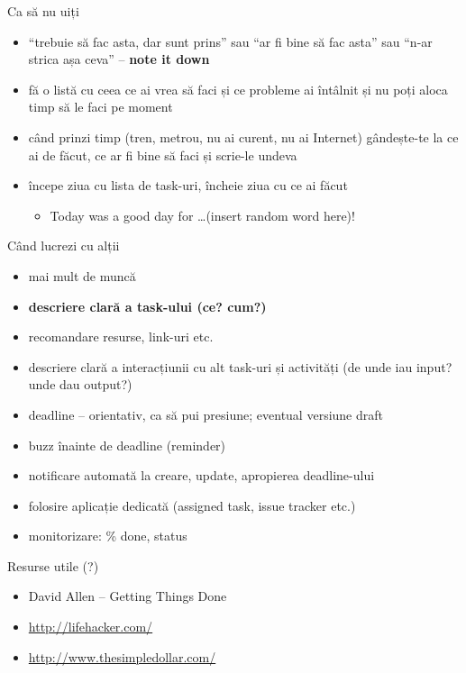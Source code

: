\documentclass{beamer}
\begin{document}
\begin{frame}{Ca să nu uiți}
  \begin{itemize}
    \item ``trebuie să fac asta, dar sunt prins'' sau ``ar fi bine să fac
    asta'' sau ``n-ar strica așa ceva'' -- \textbf{note it down}
    \item fă o listă cu ceea ce ai vrea să faci și ce probleme ai întâlnit și
    nu poți aloca timp să le faci pe moment
    \item când prinzi timp (tren, metrou, nu ai curent, nu ai Internet)
    gândește-te la ce ai de făcut, ce ar fi bine să faci și scrie-le undeva
    \item începe ziua cu lista de task-uri, încheie ziua cu ce ai făcut
      \begin{itemize}
        \item Today was a good day for \ldots (insert random word here)!
      \end{itemize}
  \end{itemize}
\end{frame}

\begin{frame}{Când lucrezi cu alții}
  \begin{itemize}
    \item mai mult de muncă
    \item \textbf{descriere clară a task-ului (ce? cum?)}
    \item recomandare resurse, link-uri etc.
    \item descriere clară a interacțiunii cu alt task-uri și activități (de
    unde iau input? unde dau output?)
    \item deadline -- orientativ, ca să pui presiune; eventual versiune draft
    \item buzz înainte de deadline (reminder)
    \item notificare automată la creare, update, apropierea deadline-ului
    \item folosire aplicație dedicată (assigned task, issue tracker etc.)
    \item monitorizare: \% done, status
  \end{itemize}
\end{frame}

\begin{frame}{Resurse utile (?)}
  \begin{itemize}
    \item David Allen -- Getting Things Done
    \item \url{http://lifehacker.com/}
    \item \url{http://www.thesimpledollar.com/}
  \end{itemize}
\end{frame}
\end{document}
